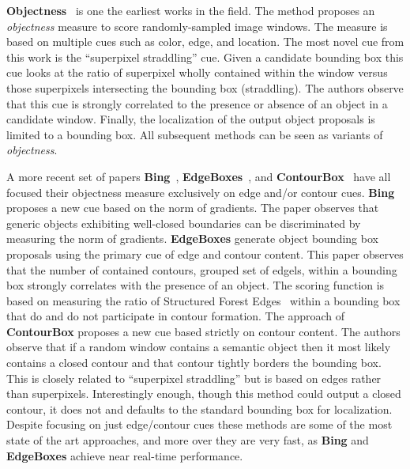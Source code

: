 {\bf Objectness}~\cite{Alexe:etal:PAMI12} is one the earliest works in the field. The method proposes an \emph{objectness} measure to score randomly-sampled image windows. The measure is based on multiple cues such as color, edge, and location. The most novel cue from this work is the ``superpixel straddling'' cue. Given a candidate bounding box this cue looks at the ratio of superpixel wholly contained within the window versus those superpixels intersecting the bounding box (straddling). The authors observe that this cue is strongly correlated to the presence or absence of an object in a candidate window. Finally, the localization of the output object proposals is limited to a bounding box. All subsequent methods can be seen as variants of \emph{objectness}.

A more recent set of papers  {\bf Bing}~\cite{Cheng:etal:CVPR14}, {\bf EdgeBoxes}~\cite{Zitnick:Dollar:ECCV14}, and {\bf ContourBox}~\cite{Lu:etal:ICCV15} have all focused their objectness measure exclusively on edge and/or contour cues. {\bf Bing} proposes a new cue based on the norm of gradients. The paper observes that generic objects exhibiting well-closed boundaries can be discriminated by measuring the norm of gradients. {\bf EdgeBoxes} generate object bounding box proposals using the primary cue of edge and contour content. This paper observes that the number of contained contours, grouped set of edgels, within a bounding box strongly correlates with the presence of an object. The scoring function is based on measuring the ratio of Structured Forest Edges~\cite{Dollar:Zitnick:PAMI15} within a bounding box that do and do not participate in contour formation. The approach of {\bf ContourBox} proposes a new cue based strictly on contour content. The authors observe that if a random window contains a semantic object then it most likely contains a closed contour and that contour tightly borders the bounding box. This is closely related to ``superpixel straddling'' but is based on edges rather than superpixels. Interestingly enough, though this method could output a closed contour, it does not and defaults to the standard bounding box for localization. Despite focusing on just edge/contour cues these methods are some of the most state of the art approaches, and more over they are very fast, as {\bf Bing} and {\bf EdgeBoxes} achieve near real-time performance.
 
